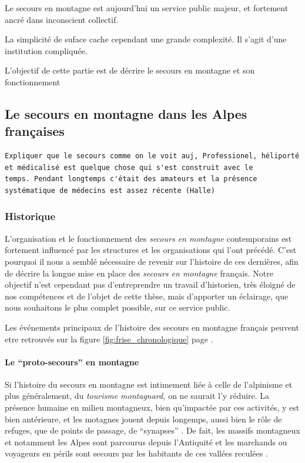 Le secours en montagne est aujourd'hui un service public majeur, et
fortement ancré dans inconscient collectif.

La simplicité de suface cache cependant une grande complexité. Il
s'agit d'une institution compliquée.

L'objectif de cette partie est de décrire le secours en montagne et
son fonctionnement

\subsection{Le secours en montagne dans les Alpes françaises}
\label{subsec:1-1-1}


\begin{verbatim}
Expliquer que le secours comme on le voit auj, Professionel, héliporté
et médicalisé est quelque chose qui s'est construit avec le
temps. Pendant longtemps c'était des amateurs et la présence
systématique de médecins est assez récente (Halle)
\end{verbatim}

\subsubsection{Historique}
\label{subsubsec:1-1-1-1}

L'organisation et le fonctionnement des \emph{secours en montagne}
contemporains est fortement influencé par les structures et les
organisations qui l'ont précédé. C'est pourquoi il nous a semblé
nécessaire de revenir sur l'histoire de ces dernières, afin de décrire
la longue mise en place des \emph{secours en montagne} français. Notre
objectif n'est cependant pas d'entreprendre un travail d'historien,
très éloigné de nos compétences et de l'objet de cette thèse, mais
d'apporter un éclairage, que nous souhaitons le plus complet possible,
sur ce service public.

Les événements principaux de l'histoire des secours en montagne
français peuvent etre retrouvés sur la figure
\ref{fig:frise_chronologique} page \pageref{fig:frise_chronologique}.

\paragraph{Le \enquote{proto-secours} en montagne}
\label{par:1-1-1-1-1}

Si l'histoire du secours en montagne est intimement liée à celle de
l'alpinisme et plus généralement, du \emph{tourisme montagnard,} on ne
saurait l'y réduire. La présence humaine en milieu montagneux, bien
qu'impactée par ces activités, y est bien antérieure, et les motagnes
jouent depuis longemps, aussi bien le rôle de refuges, que de points
de passage, de \enquote{synapses} \autocite[p. 337]{Brunet1992}. De
fait, les massifs montagneux et notamment les Alpes sont parcourus
depuis l'Antiquité et les marchands ou voyageurs en périls sont
secours par les habitants de ces vallées reculées
\autocite{Mezin2016}.

